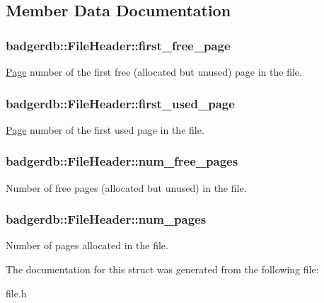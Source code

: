 \subsection{Member Data Documentation}
\hypertarget{structbadgerdb_1_1FileHeader_aa86917d8554a42318c795471f32ad006}{
\subsubsection[{first\-\_\-free\-\_\-page}]{ badgerdb\-::\-File\-Header\-::first\-\_\-free\-\_\-page}}\label{structbadgerdb_1_1FileHeader_aa86917d8554a42318c795471f32ad006}
\hyperlink{classbadgerdb_1_1Page}{Page} number of the first free (allocated but unused) page in the file. \hypertarget{structbadgerdb_1_1FileHeader_ad006b5b9d02b8c20e7ad5226680779c6}{
\subsubsection[{first\-\_\-used\-\_\-page}]{ badgerdb\-::\-File\-Header\-::first\-\_\-used\-\_\-page}}\label{structbadgerdb_1_1FileHeader_ad006b5b9d02b8c20e7ad5226680779c6}
\hyperlink{classbadgerdb_1_1Page}{Page} number of the first used page in the file. \hypertarget{structbadgerdb_1_1FileHeader_a07ac20f98d6aced3eb5358e0d4830abc}{
\subsubsection[{num\-\_\-free\-\_\-pages}]{ badgerdb\-::\-File\-Header\-::num\-\_\-free\-\_\-pages}}\label{structbadgerdb_1_1FileHeader_a07ac20f98d6aced3eb5358e0d4830abc}
Number of free pages (allocated but unused) in the file. \hypertarget{structbadgerdb_1_1FileHeader_aa1cfc5220c6795868c8301cec298c8a6}{
\subsubsection[{num\-\_\-pages}]{ badgerdb\-::\-File\-Header\-::num\-\_\-pages}}\label{structbadgerdb_1_1FileHeader_aa1cfc5220c6795868c8301cec298c8a6}
Number of pages allocated in the file. 

The documentation for this struct was generated from the following file\-:\begin{DoxyCompactItemize}
\item 
file.\-h\end{DoxyCompactItemize}
